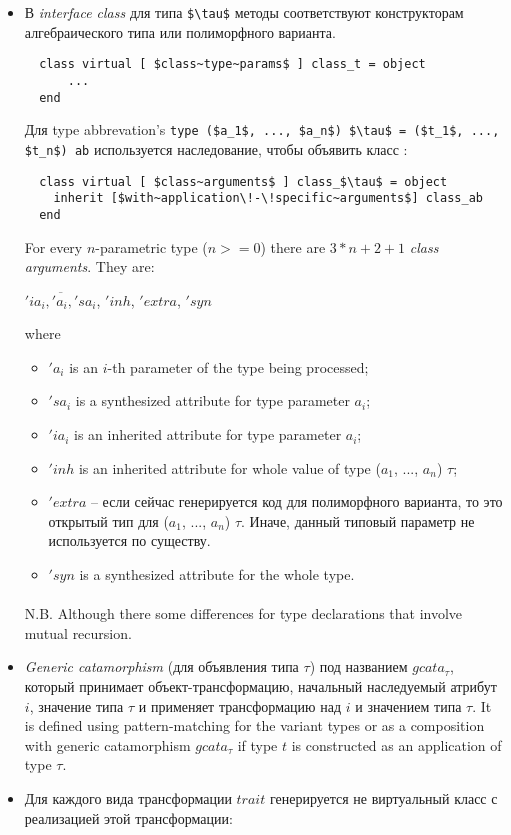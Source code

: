 \documentclass[acmsmall,review,anonymous]{acmart}\settopmatter{printfolios=true,printccs=false,printacmref=false}
\begin{document}
\begin{itemize}
  \item В \textit{interface class} для типа \lstinline{$\tau$} методы соответствуют конструкторам алгебраического типа или полиморфного варианта. 
  \begin{lstlisting}
  class virtual [ $class~type~params$ ] class_t = object
      ...
  end
  \end{lstlisting}
  Для type abbrevation's \lstinline{type ($a_1$, ..., $a_n$) $\tau$ = ($t_1$, ..., $t_n$) ab} 
  используется наследование, чтобы объявить класс : 
  \begin{lstlisting}
  class virtual [ $class~arguments$ ] class_$\tau$ = object
    inherit [$with~application\!-\!specific~arguments$] class_ab
  end
  \end{lstlisting}

  For every $n$-parametric type ($n>=0$) there are $3*n+2+1$ \emph{class arguments}. They are:
    \begin{center}
        $\overline{'ia_i, 'a_i, 'sa_i}$, $'inh$, $'extra$, $'syn$
    \end{center}
  where \begin{itemize}
          \item $'a_i$ is an $i$-th parameter of the type being processed;
          \item $'sa_i$ is a synthesized attribute for type parameter $a_i$;
          \item $'ia_i$ is an inherited attribute for type parameter $a_i$;
          \item $'inh$ is an inherited attribute for whole value of type ($a_1$, ..., $a_n$) $\tau$;
          \item $'extra$ -- если сейчас генерируется код для полиморфного варианта, то 
          это открытый тип для ($a_1$, ..., $a_n$) $\tau$. Иначе, данный типовый параметр 
          не используется по существу.
          \item $'syn$ is a synthesized attribute for the whole type.
  \end{itemize}
  
  \paragraph{}
  N.B. Although there some differences for type declarations that involve mutual recursion.
  
  \item \emph{Generic catamorphism} (для объявления типа $\tau$) под названием $gcata_\tau$, который принимает объект-трансформацию, начальный наследуемый атрибут $i$, значение типа $\tau$ и применяет трансформацию над $i$ и значением типа $\tau$. It is defined using pattern-matching for the variant types or as a composition with generic catamorphism $gcata_\tau$ if type $t$ is constructed as an application of type $\tau$.
  \item Для каждого вида трансформации $trait$ генерируется не виртуальный класс с реализацией этой трансформации:


\end{itemize}
\end{document}
